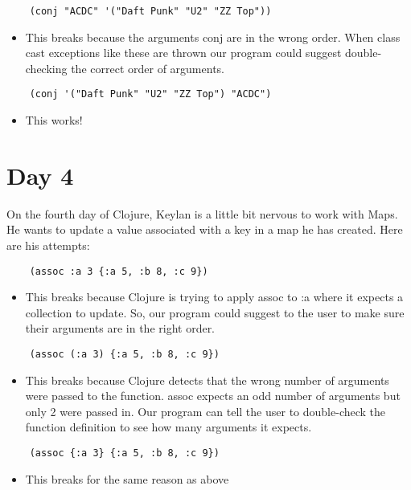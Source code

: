 \documentclass[12pt]{article}
\begin{document}
\begin{verbatim}
	(conj "ACDC" '("Daft Punk" "U2" "ZZ Top"))
\end{verbatim}
\begin{itemize}
	\item This breaks because the arguments conj are in the wrong order. When class cast exceptions like these are thrown our program could suggest double-checking the correct order of arguments.
\end{itemize}

\begin{verbatim}
	(conj '("Daft Punk" "U2" "ZZ Top") "ACDC")
\end{verbatim}
\begin{itemize}
	\item This works!
\end{itemize}

\section{Day 4}
On the fourth day of Clojure, Keylan is a little bit nervous to work with Maps. He wants to update a value associated with a key in a map he has created. Here are his attempts:
\begin{verbatim}
	(assoc :a 3 {:a 5, :b 8, :c 9})
\end{verbatim}
\begin{itemize}
	\item This breaks because Clojure is trying to apply assoc to :a where it expects a collection to update. So, our program could suggest to the user to make sure their arguments are in the right order.
\end{itemize}

\begin{verbatim}
	(assoc (:a 3) {:a 5, :b 8, :c 9})
\end{verbatim}
\begin{itemize}
	\item This breaks because Clojure detects that the wrong number of arguments were passed to the function. assoc expects an odd number of arguments but only 2 were passed in. Our program can tell the user to double-check the function definition to see how many arguments it expects.
\end{itemize}

\begin{verbatim}
	(assoc {:a 3} {:a 5, :b 8, :c 9})
\end{verbatim}
\begin{itemize}
	\item This breaks for the same reason as above
\end{itemize}
\end{document}
